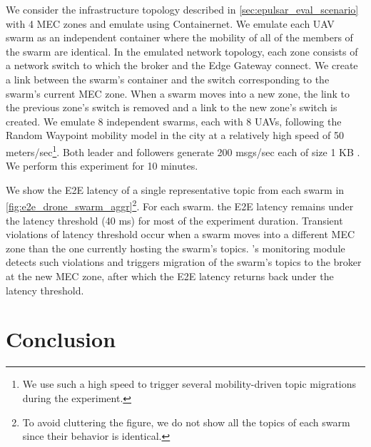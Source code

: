 We consider the infrastructure topology described in \cref{sec:epulsar_eval_scenario} with 4 MEC zones and emulate using Containernet. We emulate each UAV swarm as an independent container where the mobility of all of the members of the swarm are identical. In the emulated network topology, each zone consists of a network switch to which the broker and the Edge Gateway connect. We create a link between the swarm's container and the switch corresponding to the swarm's current MEC zone. When a swarm moves into a new zone, the link to the previous zone's switch is removed and a link to the new zone's switch is created. We emulate 8 independent swarms, each with 8 UAVs, following the Random Waypoint mobility model in the city at a relatively high speed of 50 meters/sec\footnote{We use such a high speed to trigger several mobility-driven topic migrations during the experiment.}. Both leader and followers generate 200 msgs/sec each of size 1 KB \cite{yang2018telecom}. We perform this experiment for 10 minutes.
\par We show the E2E latency of a single representative topic from each swarm in \cref{fig:e2e_drone_swarm_aggr}\footnote{To avoid cluttering the figure, we do not show all the topics of each swarm since their behavior is identical.}.
For each swarm. the E2E latency remains under the latency threshold  (40 ms) for most of the experiment duration. Transient violations of latency threshold occur when a swarm moves into a different MEC zone than the one currently hosting the swarm's topics. \epulsar{}'s monitoring module detects such violations and triggers migration of the swarm's topics to the broker at the new MEC zone, after which the E2E latency returns back under the latency threshold.

\section{Conclusion}